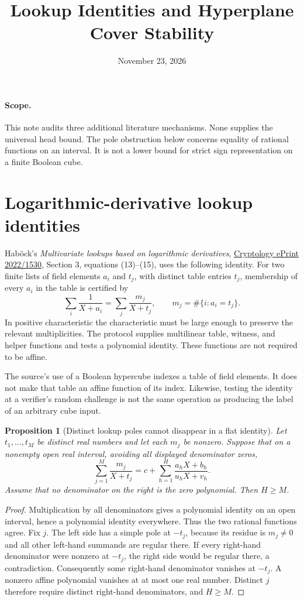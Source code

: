 \documentclass[11pt]{article}
\title{Lookup Identities and Hyperplane Cover Stability}
\author{}
\date{November 23, 2026}
\newtheorem{proposition}{Proposition}
\begin{document}
\maketitle

\paragraph{Scope.}
This note audits three additional literature mechanisms. None supplies
the universal head bound. The pole obstruction below concerns equality
of rational functions on an interval. It is not a lower bound for strict
sign representation on a finite Boolean cube.

\section{Logarithmic-derivative lookup identities}

Hab\"ock's \emph{Multivariate lookups based on logarithmic derivatives},
\href{https://eprint.iacr.org/2022/1530}{Cryptology ePrint 2022/1530},
Section 3, equations (13)--(15), uses the following identity. For two
finite lists of field elements $a_i$ and $t_j$, with distinct table
entries $t_j$, membership of every $a_i$ in the table is certified by
\[
 \sum_i\frac{1}{X+a_i}=\sum_j\frac{m_j}{X+t_j},
 \qquad m_j=\#\{i:a_i=t_j\}.
\]
In positive characteristic the characteristic must be large enough to
preserve the relevant multiplicities. The protocol supplies multilinear
table, witness, and helper functions and tests a polynomial identity.
These functions are not required to be affine.

The source's use of a Boolean hypercube indexes a table of field
elements. It does not make that table an affine function of its index.
Likewise, testing the identity at a verifier's random challenge is not
the same operation as producing the label of an arbitrary cube input.

\begin{proposition}[Distinct lookup poles cannot disappear in a flat identity]
Let $t_1,\ldots,t_M$ be distinct real numbers and let each $m_j$ be
nonzero. Suppose that on a nonempty open real interval, avoiding all
displayed denominator zeros,
\[
 \sum_{j=1}^M\frac{m_j}{X+t_j}
 =c+\sum_{h=1}^H\frac{a_hX+b_h}{u_hX+v_h}.
\]
Assume that no denominator on the right is the zero polynomial.
Then $H\ge M$.
\end{proposition}
\begin{proof}
Multiplication by all denominators gives a polynomial identity on an
open interval, hence a polynomial identity everywhere. Thus the two
rational functions agree. Fix $j$. The left side has a simple pole
at $-t_j$, because its residue is $m_j\ne0$ and all other left-hand
summands are regular there. If every right-hand denominator were
nonzero at $-t_j$, the right side would be regular there, a
contradiction. Consequently some right-hand denominator vanishes at
$-t_j$. A nonzero affine polynomial vanishes at at most one real
number. Distinct $j$ therefore require distinct right-hand denominators,
and $H\ge M$.
\end{proof}
\end{document}

